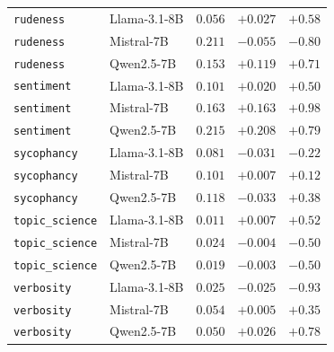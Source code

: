 \begin{table}[htbp]
\begin{tabular}{llccc}
    \texttt{rudeness} & Llama-3.1-8B & $0.056$ & $+0.027$ & $+0.58$ \\
    \texttt{rudeness} & Mistral-7B & $0.211$ & $-0.055$ & $-0.80$ \\
    \texttt{rudeness} & Qwen2.5-7B & $0.153$ & $+0.119$ & $+0.71$ \\
    \texttt{sentiment} & Llama-3.1-8B & $0.101$ & $+0.020$ & $+0.50$ \\
    \texttt{sentiment} & Mistral-7B & $0.163$ & $+0.163$ & $+0.98$ \\
    \texttt{sentiment} & Qwen2.5-7B & $0.215$ & $+0.208$ & $+0.79$ \\
    \texttt{sycophancy} & Llama-3.1-8B & $0.081$ & $-0.031$ & $-0.22$ \\
    \texttt{sycophancy} & Mistral-7B & $0.101$ & $+0.007$ & $+0.12$ \\
    \texttt{sycophancy} & Qwen2.5-7B & $0.118$ & $-0.033$ & $+0.38$ \\
    \texttt{topic\_science} & Llama-3.1-8B & $0.011$ & $+0.007$ & $+0.52$ \\
    \texttt{topic\_science} & Mistral-7B & $0.024$ & $-0.004$ & $-0.50$ \\
    \texttt{topic\_science} & Qwen2.5-7B & $0.019$ & $-0.003$ & $-0.50$ \\
    \texttt{verbosity} & Llama-3.1-8B & $0.025$ & $-0.025$ & $-0.93$ \\
    \texttt{verbosity} & Mistral-7B & $0.054$ & $+0.005$ & $+0.35$ \\
    \texttt{verbosity} & Qwen2.5-7B & $0.050$ & $+0.026$ & $+0.78$ \\
    \bottomrule
  \end{tabular}
\end{table}
